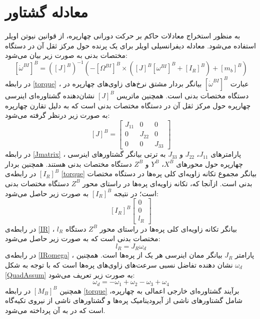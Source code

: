\section{معادله گشتاور}
به منظور استخراج معادلات حاکم بر حرکت دورانی چهارپره، از قوانین نیوتن اویلر استفاده می‌شود. 
معادله دیفرانسیلی اویلر برای یک پرنده حول مرکز ثقل آن در دستگاه مختصات بدنی به صورت زیر بیان می‌شود\cite{thomasson_2014}:
\begin{equation}\label{torque}
	\left[\dot\omega^{BI}\right]^B = \left(\left[J\right]^B\right)^{-1}
	\left(-\left[\Omega^{BI}\right]^B\times\left(
	\left[J\right]^B\left[\omega^{BI}\right]^B+
	\left[I_R\right]^B
	\right)+ \left[m_b\right]^B\right)
\end{equation}
در رابطه
\ref{torque}
، عبارت 
$\left[\dot\omega^{BI}\right]^B$
بیانگر بردار مشتق نرخ‌های زاوی‌های چهارپره در دستگاه مختصات بدنی است. همچنین ماتریس 
$\left[J\right]^B$
نشان‌دهنده گشتاوره‌ای اینرسی چهارپره حول مرکز ثقل آن در دستگاه مختصات بدنی است که به دلیل تقارن چهارپره به صورت زیر درنظر گرفته
 می‌شود:
 \begin{equation}\label{Jmatrix}
 	\left[J\right]^B = \begin{bmatrix}
 		J_{11} & 0 &0\\
 		0 & J_{22} & 0\\
 		0 & 0 & J_{33}
 	\end{bmatrix}
 \end{equation}
در رابطه 
\ref{Jmatrix}
، پارامترهای 
$J_{11}$،
$J_{22}$
و 
$J_{33}$
به ترتی بیانگر گشتاور‌های اینرسی چهارپره حول محورهای 
$X^B$،
$Y^B$
و 
$Z^B$
دستگاه مختصات بدنی هستند. همچنین بردار 
$\left[I_R\right]^B$
در رابطه‌ی 
\ref{torque}
بیانگر مجموع تكانه زاویه‌ای کلی پره‌ها در دستگاه مختصات بدنی است. ازآنجا که، تكانه زاویه‌ای پره‌ها در راستای محور
$Z^B$
دستگاه مختصات بدنی است؛ در نتیجه 
$\left[I_R\right]^B$
به صورت زیر حاصل می‌شود:
\begin{equation}\label{IR}
	\left[I_R\right]^B
	\begin{bmatrix}
		0\\0\\l_R
	\end{bmatrix}
\end{equation}
در رابطه‌ی 
\ref{IR}
، 
$l_R$
بیانگر تكانه زاویه‌ای کلی پره‌ها در راستای محور
$Z^B$
دستگاه مختصات بدنی است که به صورت زیر حاصل می‌شود:
\begin{equation}\label{IRomega}
	l_R = J_R\omega_d
\end{equation}
در رابطه‌ی
\ref{IRomega}
، پارامتر
$J_R$
بیانگر ممان اینرسی هر یک از پره‌ها است. همچنین
$\omega_d$
نشان دهنده تفاضل نسبی سرعت‌های زاوی‌های پره‌ها است که با توجه به شكل
\ref{QuadAssum}
به صورت زیر تعریف می‌شود:
\begin{equation}
	\omega_d = -\omega_1 + \omega_2-\omega_3 + \omega_4
\end{equation}
همچنین 
$\left[M_B\right]^B$
در رابطه 
\ref{torque}
برآیند گشتاوره‌ای خارجی اعمالی به چهارپره، شامل 
گشتاورهای ناشی از آیرودینامیک پره‌ها و گشتاورهای ناشی از نیروی تكیه‌گاه است که در به آن پرداخته می‌شود.



